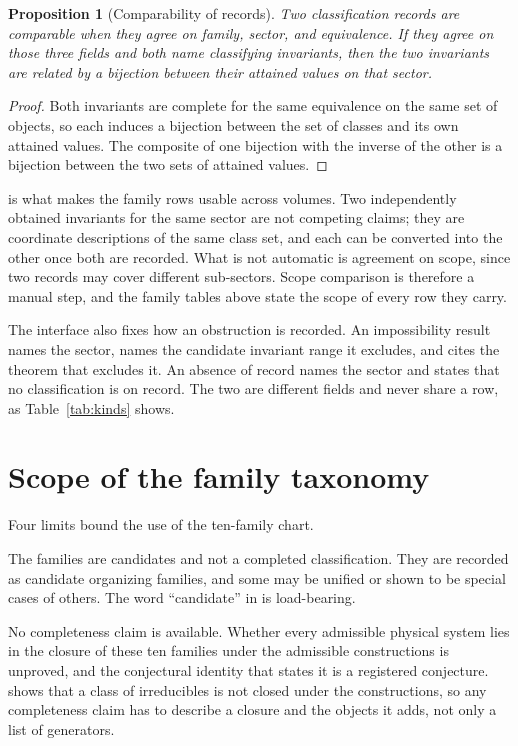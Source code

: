 \documentclass[11pt,letterpaper]{article}
\newtheorem{proposition}[theorem]{Proposition}
\theoremstyle{definition}
\theoremstyle{remark}
\begin{document}
\begin{proposition}[Comparability of records]
\label{prop:comparable}
Two classification records are comparable when they agree on family, sector, and equivalence. If they agree on those three fields and both name classifying invariants, then the two invariants are related by a bijection between their attained values on that sector.
\end{proposition}

\begin{proof}
Both invariants are complete for the same equivalence on the same set of objects, so each induces a bijection between the set of classes and its own attained values. The composite of one bijection with the inverse of the other is a bijection between the two sets of attained values.
\end{proof}

 is what makes the family rows usable across volumes. Two independently obtained invariants for the same sector are not competing claims; they are coordinate descriptions of the same class set, and each can be converted into the other once both are recorded. What is not automatic is agreement on scope, since two records may cover different sub-sectors. Scope comparison is therefore a manual step, and the family tables above state the scope of every row they carry.

The interface also fixes how an obstruction is recorded. An impossibility result names the sector, names the candidate invariant range it excludes, and cites the theorem that excludes it. An absence of record names the sector and states that no classification is on record. The two are different fields and never share a row, as Table~\ref{tab:kinds} shows.

\section{Scope of the family taxonomy}
\label{sec:limitations}

Four limits bound the use of the ten-family chart.

The families are candidates and not a completed classification. They are recorded as candidate organizing families, and some may be unified or shown to be special cases of others. The word ``candidate'' in  is load-bearing.

No completeness claim is available. Whether every admissible physical system lies in the closure of these ten families under the admissible constructions is unproved, and the conjectural identity that states it is a registered conjecture.  shows that a class of irreducibles is not closed under the constructions, so any completeness claim has to describe a closure and the objects it adds, not only a list of generators.
\end{document}
